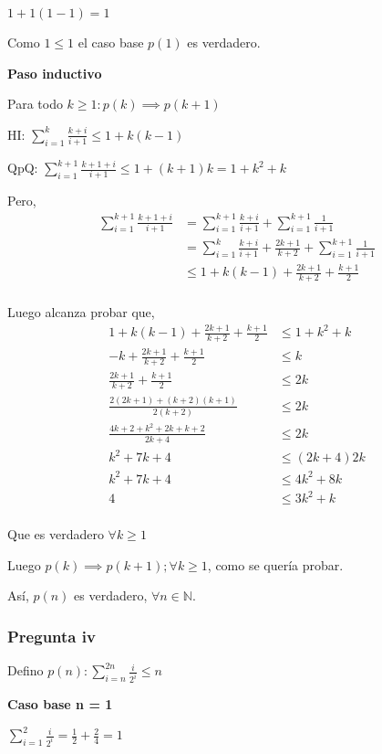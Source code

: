 $ 1+1(1-1) = 1 $

Como $ 1 \leq 1 $ el caso base $p(1)$ es verdadero.

\textbf{Paso inductivo}

Para todo $k \geq 1: p(k) \implies p(k+1)$

HI: $\sum_{i=1}^{k}\frac{k+i}{i+1} \leq 1+k(k-1)$

QpQ: $ \sum_{i=1}^{k+1}\frac{k+1+i}{i+1} \leq 1+(k+1)k = 1+k^2 + k$

Pero,
\begin{align*}
    \sum_{i=1}^{k+1}\frac{k+1+i}{i+1} &= \sum_{i=1}^{k+1}\frac{k+i}{i+1} + \sum_{i=1}^{k+1}\frac{1}{i+1} \\
    &= \sum_{i=1}^{k}\frac{k+i}{i+1} + \frac{2k+1}{k+2} + \sum_{i=1}^{k+1}\frac{1}{i+1} \\
    &\leq 1+k(k-1) + \frac{2k+1}{k+2} + \frac{k+1}{2} \\
\end{align*}

Luego alcanza probar que,
\begin{align*}
    1+k(k-1) + \frac{2k+1}{k+2} + \frac{k+1}{2} &\leq 1+k^2 + k \\
    - k + \frac{2k+1}{k+2} + \frac{k+1}{2} &\leq k \\
    \frac{2k+1}{k+2} + \frac{k+1}{2} &\leq 2k \\
    \frac{2(2k+1) + (k+2)(k+1)}{2(k+2)} &\leq 2k \\
    \frac{4k+2 + k^2+2k+k+2}{2k+4} &\leq 2k \\
    k^2 + 7k + 4 &\leq (2k+4)2k \\
    k^2 + 7k + 4 &\leq 4k^2 + 8k \\
    4 &\leq 3k^2 + k\\
\end{align*}

Que es verdadero $\forall k \geq 1$

Luego $p(k) \implies p(k+1); \forall k \geq 1$, como se quería probar.

Así, $p(n)$ es verdadero, $\forall n \in \mathbb{N}$.

\subsubsection{Pregunta iv}

Defino $ p(n): \sum_{i=n}^{2n}\frac{i}{2^i} \leq n$

\textbf{Caso base n = 1}

$ \sum_{i=1}^{2}\frac{i}{2^i} = \frac{1}{2} + \frac{2}{4} = 1 $

